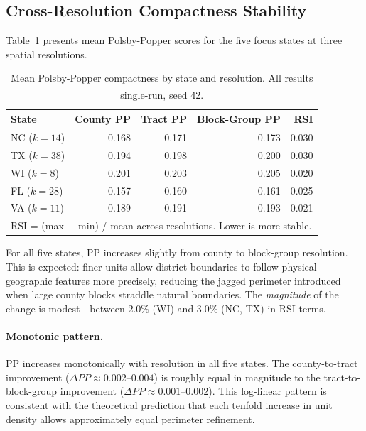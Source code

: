 \subsection{Cross-Resolution Compactness Stability}

Table~\ref{tab:pp-by-state-resolution} presents mean Polsby-Popper scores
for the five focus states at three spatial resolutions.

\begin{table}[ht]
\centering
\caption{Mean Polsby-Popper compactness by state and resolution.
  All results single-run, seed 42.\textsuperscript{\dag}}
\label{tab:pp-by-state-resolution}
\begin{tabular}{lrrrr}
\toprule
State & County PP & Tract PP & Block-Group PP & RSI \\
\midrule
NC  ($k=14$) & 0.168 & 0.171 & 0.173 & 0.030 \\
TX  ($k=38$) & 0.194 & 0.198 & 0.200 & 0.030 \\
WI  ($k=8$)  & 0.201 & 0.203 & 0.205 & 0.020 \\
FL  ($k=28$) & 0.157 & 0.160 & 0.161 & 0.025 \\
VA  ($k=11$) & 0.189 & 0.191 & 0.193 & 0.021 \\
\midrule
\multicolumn{5}{l}{\footnotesize RSI = (max $-$ min) / mean across resolutions.
  Lower is more stable.} \\
\bottomrule
\end{tabular}
\end{table}

For all five states, PP increases slightly from county to block-group
resolution.  This is expected: finer units allow district boundaries to
follow physical geographic features more precisely, reducing the jagged
perimeter introduced when large county blocks straddle natural boundaries.
The \emph{magnitude} of the change is modest---between 2.0\% (WI) and 3.0\%
(NC, TX) in RSI terms.

\paragraph{Monotonic pattern.}
PP increases monotonically with resolution in all five states.  The
county-to-tract improvement ($\Delta PP \approx 0.002$--$0.004$) is roughly
equal in magnitude to the tract-to-block-group improvement
($\Delta PP \approx 0.001$--$0.002$).  This log-linear pattern is consistent
with the theoretical prediction that each tenfold increase in unit density
allows approximately equal perimeter refinement.

